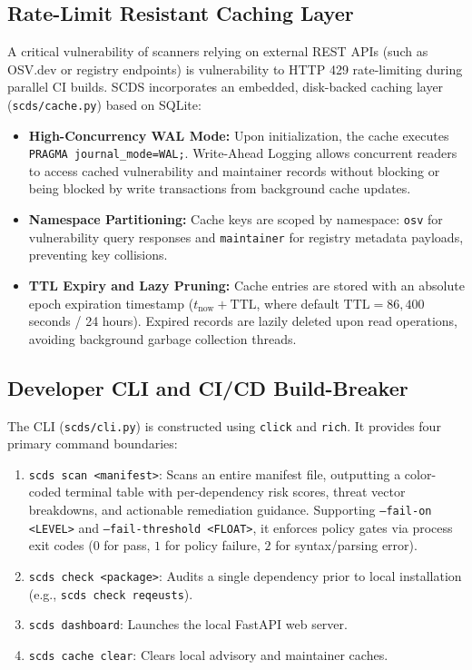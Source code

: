 \subsection{Rate-Limit Resistant Caching Layer}
\label{sec:impl_cache}
A critical vulnerability of scanners relying on external REST APIs (such as OSV.dev or registry endpoints) is vulnerability to HTTP 429 rate-limiting during parallel CI builds. SCDS incorporates an embedded, disk-backed caching layer (\texttt{scds/cache.py}) based on SQLite:
\begin{itemize}
    \item \textbf{High-Concurrency WAL Mode:} Upon initialization, the cache executes \texttt{PRAGMA journal\_mode=WAL;}. Write-Ahead Logging allows concurrent readers to access cached vulnerability and maintainer records without blocking or being blocked by write transactions from background cache updates.
    \item \textbf{Namespace Partitioning:} Cache keys are scoped by namespace: \texttt{osv} for vulnerability query responses and \texttt{maintainer} for registry metadata payloads, preventing key collisions.
    \item \textbf{TTL Expiry and Lazy Pruning:} Cache entries are stored with an absolute epoch expiration timestamp ($t_{\text{now}} + \text{TTL}$, where default $\text{TTL} = 86{,}400$\,seconds / 24 hours). Expired records are lazily deleted upon read operations, avoiding background garbage collection threads.
\end{itemize}

\subsection{Developer CLI and CI/CD Build-Breaker}
The CLI (\texttt{scds/cli.py}) is constructed using \texttt{click} and \texttt{rich}. It provides four primary command boundaries:
\begin{enumerate}
    \item \texttt{scds scan <manifest>}: Scans an entire manifest file, outputting a color-coded terminal table with per-dependency risk scores, threat vector breakdowns, and actionable remediation guidance. Supporting \texttt{--fail-on <LEVEL>} and \texttt{--fail-threshold <FLOAT>}, it enforces policy gates via process exit codes ($0$ for pass, $1$ for policy failure, $2$ for syntax/parsing error).
    \item \texttt{scds check <package>}: Audits a single dependency prior to local installation (e.g., \texttt{scds check reqeusts}).
    \item \texttt{scds dashboard}: Launches the local FastAPI web server.
    \item \texttt{scds cache clear}: Clears local advisory and maintainer caches.
\end{enumerate}

